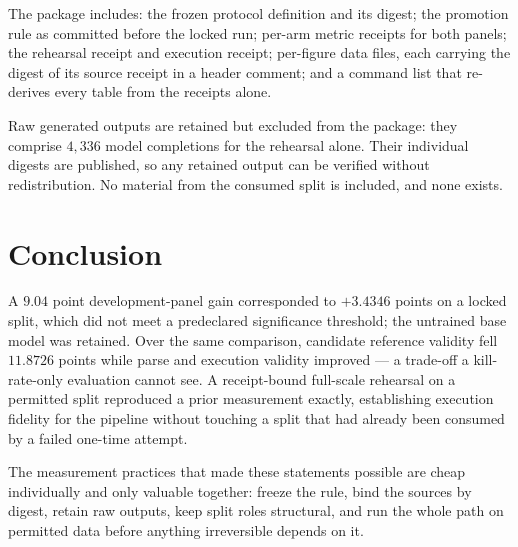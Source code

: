 \documentclass[10pt,conference,letterpaper]{IEEEtran}
\begin{document}
The package includes: the frozen protocol definition and its digest; the
promotion rule as committed before the locked run; per-arm metric receipts for
both panels; the rehearsal receipt and execution receipt; per-figure data files,
each carrying the digest of its source receipt in a header comment; and a
command list that re-derives every table from the receipts alone.

Raw generated outputs are retained but excluded from the package: they comprise
$4{,}336$ model completions for the rehearsal alone. Their individual digests are
published, so any retained output can be verified without redistribution. No
material from the consumed split is included, and none exists.

\section{Conclusion}

A $9.04$ point development-panel gain corresponded to $+3.4346$ points on a
locked split, which did not meet a predeclared significance threshold; the
untrained base model was retained. Over the same comparison, candidate reference
validity fell $11.8726$ points while parse and execution validity improved ---
a trade-off a kill-rate-only evaluation cannot see. A receipt-bound full-scale
rehearsal on a permitted split reproduced a prior measurement exactly,
establishing execution fidelity for the pipeline without touching a split that
had already been consumed by a failed one-time attempt.

The measurement practices that made these statements possible are cheap
individually and only valuable together: freeze the rule, bind the sources by
digest, retain raw outputs, keep split roles structural, and run the whole path
on permitted data before anything irreversible depends on it.



\end{document}
